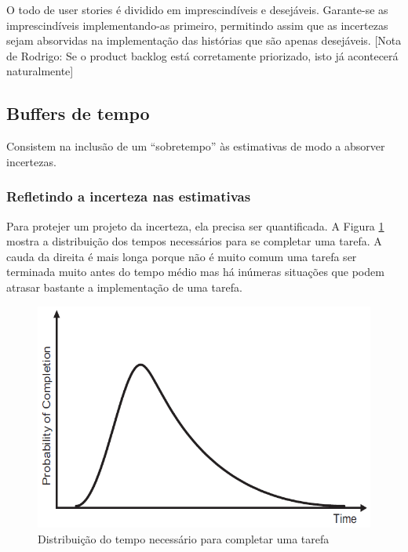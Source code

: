 \documentclass[a4paper,abntfigtabnum,noindentfirst]{abnt}
\begin{document}
O todo de user stories é dividido em imprescindíveis e desejáveis. Garante-se as imprescindíveis implementando-as primeiro, permitindo assim que as incertezas sejam absorvidas na implementação das histórias que são apenas desejáveis. [Nota de Rodrigo: Se o product backlog está corretamente priorizado, isto já acontecerá naturalmente]

\subsection{Buffers de tempo}

Consistem na inclusão de um ``sobretempo'' às estimativas de modo a absorver incertezas.

\subsubsection{Refletindo a incerteza nas estimativas}

Para protejer um projeto da incerteza, ela precisa ser quantificada. A Figura \ref{distribuicao-do-tempo-para-completar-uma-tarefa} mostra a distribuição dos tempos necessários para se completar uma tarefa. A cauda da direita é mais longa porque não é muito comum uma tarefa ser terminada muito antes do tempo médio mas há inúmeras situações que podem atrasar bastante a implementação de uma tarefa.

\begin{figure}
  \caption{Distribuição do tempo necessário para completar uma tarefa}
  \label{distribuicao-do-tempo-para-completar-uma-tarefa}
  \begin{center}
  \includegraphics[scale=0.6]{distribuicao-do-tempo-para-completar-uma-tarefa}
  \end{center}
\end{figure}
\end{document}
